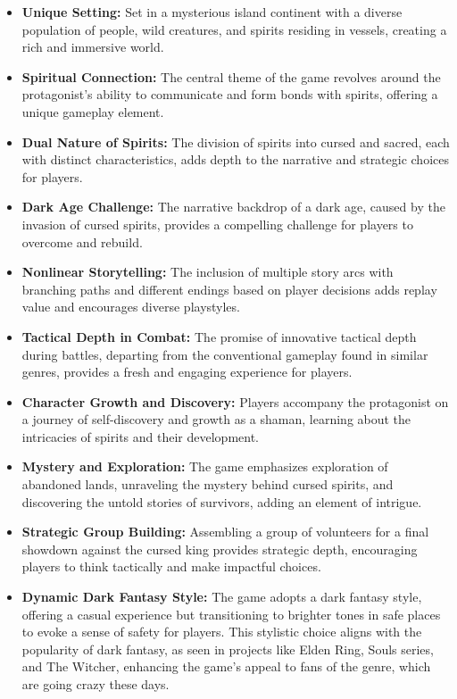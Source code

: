 \documentclass[a4paper,10pt,english]{article}
\begin{document}
\begin{itemize}
    \item \textbf{Unique Setting:} Set in a mysterious island continent with a diverse population of people, wild creatures, and spirits residing in vessels, creating a rich and immersive world.
    
    \item \textbf{Spiritual Connection:} The central theme of the game revolves around the protagonist's ability to communicate and form bonds with spirits, offering a unique gameplay element.
    
    \item \textbf{Dual Nature of Spirits:} The division of spirits into cursed and sacred, each with distinct characteristics, adds depth to the narrative and strategic choices for players.
    
    \item \textbf{Dark Age Challenge:} The narrative backdrop of a dark age, caused by the invasion of cursed spirits, provides a compelling challenge for players to overcome and rebuild.
    
    \item \textbf{Nonlinear Storytelling:} The inclusion of multiple story arcs with branching paths and different endings based on player decisions adds replay value and encourages diverse playstyles.
    
    \item \textbf{Tactical Depth in Combat:} The promise of innovative tactical depth during battles, departing from the conventional gameplay found in similar genres, provides a fresh and engaging experience for players.
    
    \item \textbf{Character Growth and Discovery:} Players accompany the protagonist on a journey of self-discovery and growth as a shaman, learning about the intricacies of spirits and their development.
    
    \item \textbf{Mystery and Exploration:} The game emphasizes exploration of abandoned lands, unraveling the mystery behind cursed spirits, and discovering the untold stories of survivors, adding an element of intrigue.
    
    \item \textbf{Strategic Group Building:} Assembling a group of volunteers for a final showdown against the cursed king provides strategic depth, encouraging players to think tactically and make impactful choices.
    
    \item \textbf{Dynamic Dark Fantasy Style:} The game adopts a dark fantasy style, offering a casual experience but transitioning to brighter tones in safe places to evoke a sense of safety for players. This stylistic choice aligns with the popularity of dark fantasy, as seen in projects like Elden Ring, Souls series, and The Witcher, enhancing the game's appeal to fans of the genre, which are going crazy these days.
\end{itemize}
\end{document}

